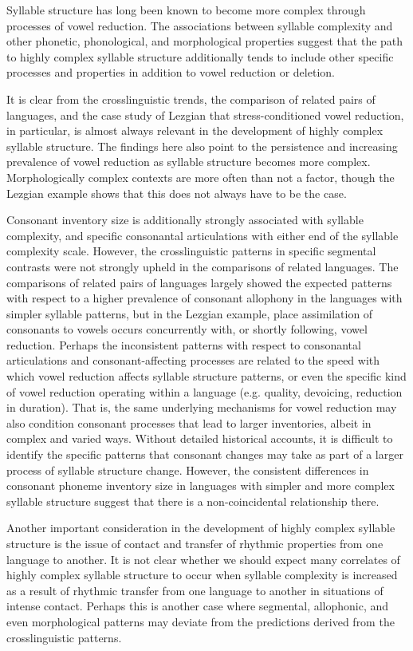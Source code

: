   Syllable structure has long been known to become more complex through processes of vowel reduction. The associations between syllable complexity and other phonetic, phonological, and morphological properties suggest that the path to highly complex syllable structure additionally tends to include other specific processes and properties in addition to vowel reduction or deletion.

  It is clear from the crosslinguistic trends, the comparison of related pairs of languages, and the case study of Lezgian that stress-conditioned vowel reduction, in particular, is almost always relevant in the development of highly complex syllable structure. The findings here also point to the persistence and increasing prevalence of vowel reduction as syllable structure becomes more complex. Morphologically complex contexts are more often than not a factor, though the Lezgian example shows that this does not always have to be the case.

  Consonant inventory size is additionally strongly associated with syllable complexity, and specific consonantal articulations with either end of the syllable complexity scale. However, the crosslinguistic patterns in specific segmental contrasts were not strongly upheld in the comparisons of related languages. The comparisons of related pairs of languages largely showed the expected patterns with respect to a higher prevalence of consonant allophony in the languages with simpler syllable patterns, but in the Lezgian example, place assimilation of consonants to vowels occurs concurrently with, or shortly following, vowel reduction. Perhaps the inconsistent patterns with respect to consonantal articulations and consonant-affecting processes are related to the speed with which vowel reduction affects syllable structure patterns, or even the specific kind of vowel reduction operating within a language (e.g. quality, devoicing, reduction in duration). That is, the same underlying mechanisms for vowel reduction may also condition consonant processes that lead to larger inventories, albeit in complex and varied ways. Without detailed historical accounts, it is difficult to identify the specific patterns that consonant changes may take as part of a larger process of syllable structure change. However, the consistent differences in consonant phoneme inventory size in languages with simpler and more complex syllable structure suggest that there is a non-coincidental relationship there.

  Another important consideration in the development of highly complex syllable structure is the issue of contact and transfer of rhythmic properties from one language to another. It is not clear whether we should expect many correlates of highly complex syllable structure to occur when syllable complexity is increased as a result of rhythmic transfer from one language to another in situations of intense contact. Perhaps this is another case where segmental, allophonic, and even morphological patterns may deviate from the predictions derived from the crosslinguistic patterns.


